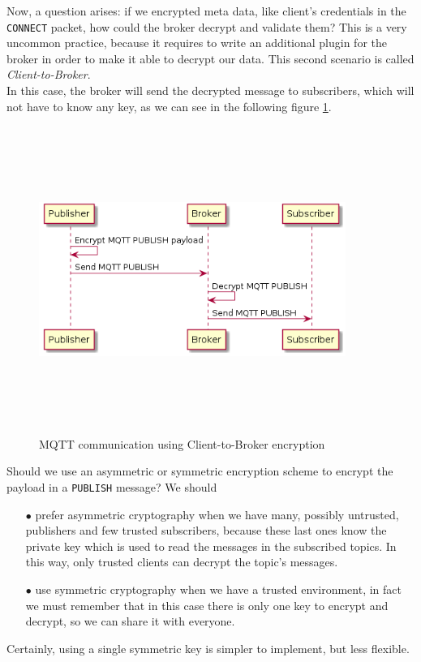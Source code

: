 \documentclass[12pt]{report}
\begin{document}
{Now, a question arises: if we encrypted meta data, like client's credentials in the \texttt{CONNECT} packet, how could the broker decrypt and validate them?
This is a very uncommon practice, because it requires to write an additional plugin for the broker in order to make it able to decrypt our data. 
This second scenario is called \emph{Client-to-Broker}.\\
In this case, the broker will send the decrypted message to subscribers, which will not have to know any key, as we can see in the following figure \ref{fig:mqttclienttobroker}.

\begin{figure}[H]
\includegraphics[width=10cm,height=10cm,keepaspectratio]{client_to_broker}
\centering
\caption{MQTT communication using Client-to-Broker encryption}
\label{fig:mqttclienttobroker}
\end{figure}

Should we use an asymmetric or symmetric encryption scheme to encrypt the payload in a \texttt{PUBLISH} message? We should

\begin{itemize}
\setlength{\itemindent}{+4mm}
\item[$\bullet$] prefer asymmetric cryptography when we have many, possibly untrusted, publishers and few trusted subscribers, because these last ones know the private key which is used to read the messages in the subscribed topics.
In this way, only trusted clients can decrypt the topic's messages.
\item[$\bullet$] use symmetric cryptography when we have a trusted environment, in fact we must remember that in this case there is only one key to encrypt and decrypt, so we can share it with everyone.
\end{itemize}
\bigskip
Certainly, using a single symmetric key is simpler to implement, but less flexible.\\

}
\end{document}
